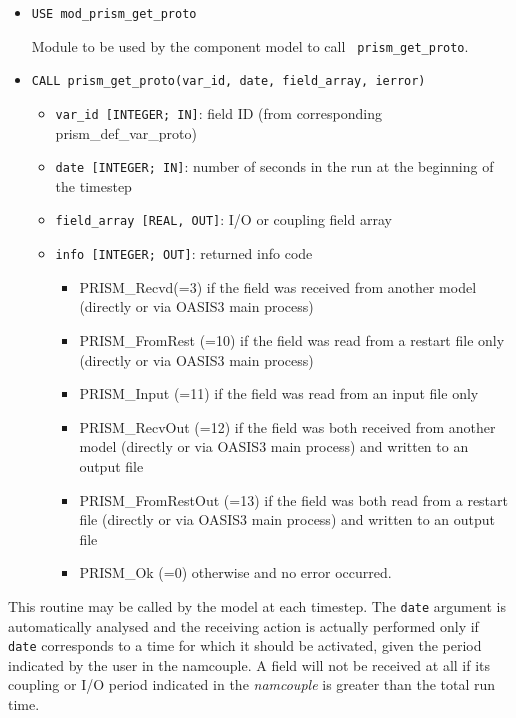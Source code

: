 \begin{itemize} 
\item {\tt USE  mod\_prism\_get\_proto}

Module to be used by the component model to call {\tt
  prism\_get\_proto}.
\item {\tt CALL prism\_get\_proto(var\_id, date, field\_array, ierror)}
\begin{itemize}
\item {\tt var\_id [INTEGER; IN]}: field ID (from
  corresponding prism\_def\_var\_proto)
\item {\tt date [INTEGER; IN]}: number of seconds in the run at the
beginning of the timestep
\item {\tt field\_array [REAL, OUT]}: I/O or coupling field array 
\item {\tt info [INTEGER; OUT]}: returned info code
   \begin{itemize} 
      \item PRISM\_Recvd(=3) if the field was received from another model
       (directly or via OASIS3 main process)
      \item PRISM\_FromRest (=10) if the field was read from a restart
       file only (directly or via OASIS3 main process)
      \item PRISM\_Input (=11) if the field was read from an input
       file only
      \item PRISM\_RecvOut (=12) if the field was both received from
       another model (directly or via OASIS3 main process) and written to
       an output file
      \item PRISM\_FromRestOut (=13) if the field was both read from a
       restart file (directly or via OASIS3 main process) and written to an
       output file
      \item PRISM\_Ok (=0) otherwise and no error occurred.
   \end{itemize}
\end{itemize}
\end{itemize}

This routine may be called by the model at each timestep. The {\tt date}
argument is automatically analysed and the receiving action is actually
performed only if {\tt date} corresponds to a time for which it should
be activated, given the period indicated by the user in the
namcouple. A field will not be received at all if its
coupling or I/O period indicated in the {\it namcouple} is greater
than the total run time.

